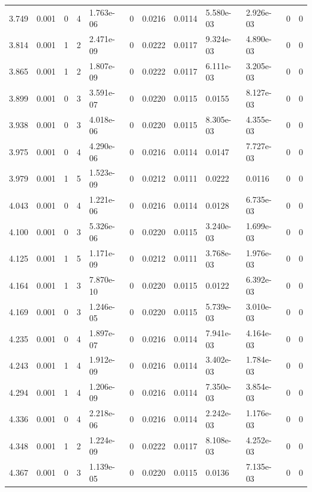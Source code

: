 \documentclass[preview]{standalone}
\begin{document}
{{{\begin{tabular}{L{1.2cm}C{1.2cm} C{0.3cm}C{0.5cm} C{1.4cm}C{1.4cm} C{1.4cm}C{1.4cm} C{1.6cm}C{1.6cm} C{1.6cm}C{1.6cm}}
  3.749  &  0.001  & 0     &  4 &  1.763e-06  & 0  &  0.0216&   0.0114& 5.580e-03 & 2.926e-03   &  0 & 0  \\ 
  3.814  &  0.001  & 1     &  2 &  2.471e-09  & 0  &  0.0222&   0.0117& 9.324e-03 & 4.890e-03   &  0 & 0  \\ 
  3.865  &  0.001  & 1     &  2 &  1.807e-09  & 0  &  0.0222&   0.0117& 6.111e-03 & 3.205e-03   &  0 & 0  \\ 
  3.899  &  0.001  & 0     &  3 &  3.591e-07  & 0  &  0.0220&   0.0115& 0.0155 & 8.127e-03   &  0 & 0  \\ 
  3.938  &  0.001  & 0     &  3 &  4.018e-06  & 0  &  0.0220&   0.0115& 8.305e-03 & 4.355e-03   &  0 & 0  \\ 
  3.975  &  0.001  & 0     &  4 &  4.290e-06  & 0  &  0.0216&   0.0114& 0.0147 & 7.727e-03   &  0 & 0  \\ 
  3.979  &  0.001  & 1     &  5 &  1.523e-09  & 0  &  0.0212&   0.0111& 0.0222 & 0.0116   &  0 & 0  \\ 
  4.043  &  0.001  & 0     &  4 &  1.221e-06  & 0  &  0.0216&   0.0114& 0.0128 & 6.735e-03   &  0 & 0  \\ 
  4.100  &  0.001  & 0     &  3 &  5.326e-06  & 0  &  0.0220&   0.0115& 3.240e-03 & 1.699e-03   &  0 & 0  \\ 
  4.125  &  0.001  & 1     &  5 &  1.171e-09  & 0  &  0.0212&   0.0111& 3.768e-03 & 1.976e-03   &  0 & 0  \\ 
  4.164  &  0.001  & 1     &  3 &  7.870e-10  & 0  &  0.0220&   0.0115& 0.0122 & 6.392e-03   &  0 & 0  \\ 
  4.169  &  0.001  & 0     &  3 &  1.246e-05  & 0  &  0.0220&   0.0115& 5.739e-03 & 3.010e-03   &  0 & 0  \\ 
  4.235  &  0.001  & 0     &  4 &  1.897e-07  & 0  &  0.0216&   0.0114& 7.941e-03 & 4.164e-03   &  0 & 0  \\ 
  4.243  &  0.001  & 1     &  4 &  1.912e-09  & 0  &  0.0216&   0.0114& 3.402e-03 & 1.784e-03   &  0 & 0  \\ 
  4.294  &  0.001  & 1     &  4 &  1.206e-09  & 0  &  0.0216&   0.0114& 7.350e-03 & 3.854e-03   &  0 & 0  \\ 
  4.336  &  0.001  & 0     &  4 &  2.218e-06  & 0  &  0.0216&   0.0114& 2.242e-03 & 1.176e-03   &  0 & 0  \\ 
  4.348  &  0.001  & 1     &  2 &  1.224e-09  & 0  &  0.0222&   0.0117& 8.108e-03 & 4.252e-03   &  0 & 0  \\ 
  4.367  &  0.001  & 0     &  3 &  1.139e-05  & 0  &  0.0220&   0.0115& 0.0136 & 7.135e-03   &  0 & 0  \\ 

\end{tabular}}}}
\end{document}

